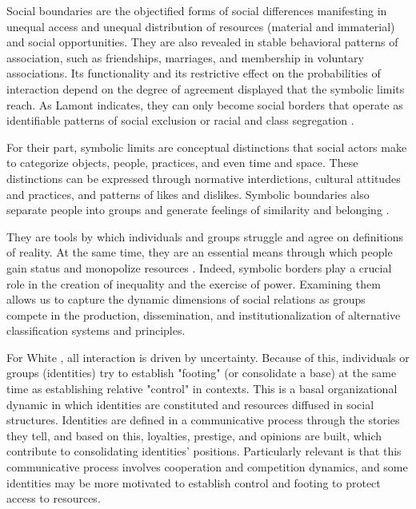 Social boundaries are the objectified forms of social differences manifesting in unequal access and unequal distribution of resources (material and immaterial) and social opportunities. They are also revealed in stable behavioral patterns of association, such as friendships, marriages, and membership in voluntary associations. Its functionality and its restrictive effect on the probabilities of interaction depend on the degree of agreement displayed that the symbolic limits reach. As Lamont indicates, they can only become social borders that operate as identifiable patterns of social exclusion or racial and class segregation \parencite{lamont_study_2002, tilly_social_2004, lamont_symbolic_2015}.
\bigskip

For their part, symbolic limits are conceptual distinctions that social actors make to categorize objects, people, practices, and even time and space. These distinctions can be expressed through normative interdictions, cultural attitudes and practices, and patterns of likes and dislikes. Symbolic boundaries also separate people into groups and generate feelings of similarity and belonging \parencite{lamont_symbolic_2015}.

They are tools by which individuals and groups struggle and agree on definitions of reality. At the same time, they are an essential means through which people gain status and monopolize resources \parencite{lamont_study_2002}. Indeed, symbolic borders play a crucial role in the creation of inequality and the exercise of power. Examining them allows us to capture the dynamic dimensions of social relations as groups compete in the production, dissemination, and institutionalization of alternative classification systems and principles.
\bigskip

For White \parencite*{white_identity_2008}, all interaction is driven by uncertainty. Because of this, individuals or groups (identities) try to establish "footing" (or consolidate a base) at the same time as establishing relative "control" in contexts. This is a basal organizational dynamic in which identities are constituted and resources diffused in social structures. Identities are defined in a communicative process through the stories they tell, and based on this, loyalties, prestige, and opinions are built, which contribute to consolidating identities' positions. Particularly relevant is that this communicative process involves cooperation and competition dynamics, and some identities may be more motivated to establish control and footing to protect access to resources.
\bigskip

